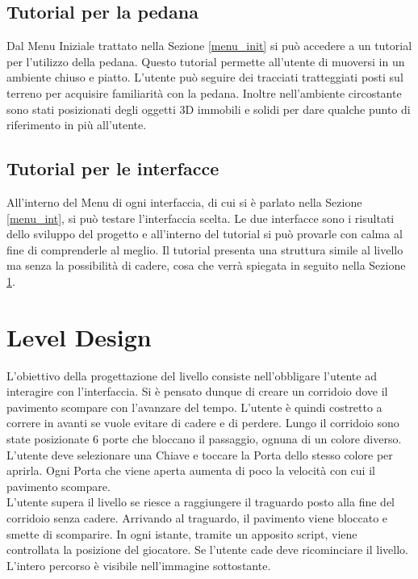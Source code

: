 \documentclass[target=bach,aauheader=]{thud}
\begin{document}
\subsection{Tutorial per la pedana}
\label{tut_ped}
Dal Menu Iniziale trattato nella Sezione \ref{menu_init} si può accedere a un tutorial per l'utilizzo della pedana.
Questo tutorial permette all'utente di muoversi in un ambiente chiuso e piatto.
L'utente può seguire dei tracciati tratteggiati posti sul terreno per acquisire familiarità con la pedana.
Inoltre nell'ambiente circostante sono stati posizionati degli oggetti 3D immobili e solidi per dare qualche punto di riferimento in più all'utente. 

\subsection{Tutorial per le interfacce}
\label{tut_int}
All'interno del Menu di ogni interfaccia, di cui si è parlato nella Sezione \ref{menu_int}, si può testare l'interfaccia scelta.
Le due interfacce sono i risultati dello sviluppo del progetto e all'interno del tutorial si può provarle con calma al fine di comprenderle al meglio.
Il tutorial presenta una struttura simile al livello ma senza la possibilità di cadere, cosa che verrà spiegata in seguito nella Sezione \ref{level}. 

\section{Level Design}
\label{level}
L'obiettivo della progettazione del livello consiste nell'obbligare l'utente ad interagire con l'interfaccia.
Si è pensato dunque di creare un corridoio dove il pavimento scompare con l'avanzare del tempo.
L'utente è quindi costretto a correre in avanti se vuole evitare di cadere e di perdere.
Lungo il corridoio sono state posizionate 6 porte che bloccano il passaggio, ognuna di un colore diverso.
L'utente deve selezionare una Chiave e toccare la Porta dello stesso colore per aprirla.
Ogni Porta che viene aperta aumenta di poco la velocità con cui il pavimento scompare. \\

L'utente supera il livello se riesce a raggiungere il traguardo posto alla fine del corridoio senza cadere.
Arrivando al traguardo, il pavimento viene bloccato e smette di scomparire.
In ogni istante, tramite un apposito script, viene controllata la posizione del giocatore.
Se l'utente cade deve ricominciare il livello.
L'intero percorso è visibile nell'immagine sottostante.
\end{document}
